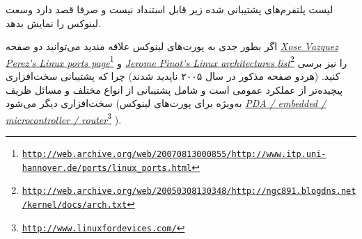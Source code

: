 
\begin{note}
لیست پلتفرم‌های پشتیبانی شده زیر قابل استنداد نیست و صرفا قصد دارد وسعت لینوکس را نمایش بدهد.
\end{note}


اگر بطور جدی به پورت‌های لینوکس علاقه مندید می‌توانید دو صفحه
\emph{\url{Xose Vazquez Perez's Linux ports page}}\footnote{\texttt{\url{http://web.archive.org/web/20070813000855/http://www.itp.uni-hannover.de/ports/linux_ports.html}}}
و
\emph{\url{Jerome Pinot's Linux architectures list}}\footnote{\texttt{\url{http://web.archive.org/web/20050308130348/http://ngc891.blogdns.net/kernel/docs/arch.txt}}}
را نیز برسی کنید.  (هردو صفحه مذکور در سال ۲۰۰۵ ناپدید شدند)
چرا که پشتیبانی سخت‌افزاری پیچیده‌تر از عملکرد عمومی  است و شامل پشتیبانی از
انواع مختلف  و مسائل ظریف سخت‌افزاری دیگر می‌شود (به‌ویژه برای پورت‌های لینوکس
\emph{\url{PDA / embedded / microcontroller / router}}\footnote{\texttt{\url{http://www.linuxfordevices.com/}}}
).





